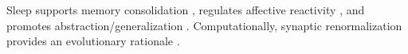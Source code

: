 Sleep supports memory consolidation \citep{memory_function2010, raschborn2013}, regulates affective reactivity \citep{yoo2007}, and promotes abstraction/generalization \citep{stickgold2013, hidden_regularities2019}. Computationally, synaptic renormalization provides an evolutionary rationale \citep{price_of_plasticity2014}.
